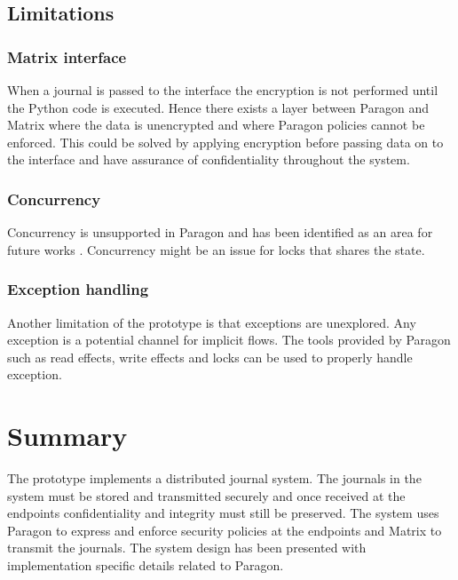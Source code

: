 
\subsection{Limitations}

\subsubsection{Matrix interface}

When a journal is passed to the interface the encryption is not performed until the Python code is executed. Hence there exists a layer between Paragon and Matrix where the data is unencrypted and where Paragon policies cannot be enforced. This could be solved by applying encryption before passing data on to the interface and have assurance of confidentiality throughout the system.

\subsubsection{Concurrency}
Concurrency is unsupported in Paragon and has been identified as an area for future works \cite{paragonprogramming}. Concurrency might be an issue for locks that shares the state.

\subsubsection{Exception handling}
Another limitation of the prototype is that exceptions are unexplored. Any exception is a potential channel for implicit flows. The tools provided by Paragon such as read effects, write effects and locks can be used to properly handle exception.


\section{Summary}
The prototype implements a distributed journal system. The journals in the system must be stored and transmitted securely and once received at the endpoints confidentiality and integrity must still be preserved. The system uses Paragon to express and enforce security policies at the endpoints and Matrix to transmit the journals. The system design has been presented with implementation specific details related to Paragon. 
